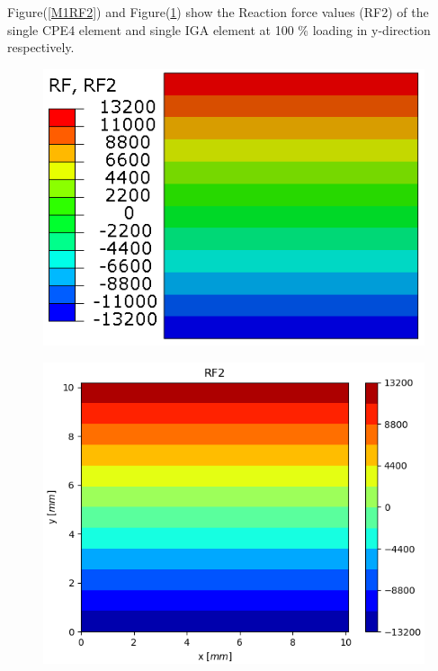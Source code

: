 \documentclass[11pt]{article}
\begin{document}
Figure(\ref{M1RF2}) and Figure(\ref{M1RF2_IGA}) show the Reaction force values (RF2) of the single CPE4 element and single IGA element at 100 \% loading in y-direction respectively. \\
\begin{figure}[H]
	\centering
	\begin{minipage}{.5\textwidth}
		\centering
		\includegraphics[width=1\linewidth]{M1RF2.png}
		\label{M1RF2}
	\end{minipage}%
	\begin{minipage}{.5\textwidth}
		\centering
		\includegraphics[width=1\linewidth]{M1RF2_IGA.png}
		\label{M1RF2_IGA}
	\end{minipage}
\end{figure}
\end{document}
